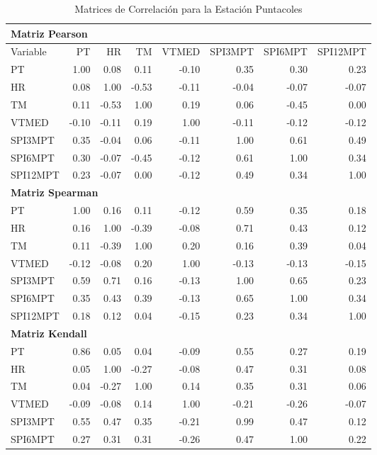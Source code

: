 \begin{table}[ht]
\centering
\caption{Matrices de Correlación para la Estación Puntacoles}
\begin{tabular}{lrrrrrrr}
\toprule
\multicolumn{8}{l}{\textbf{Matriz Pearson}} \\
\midrule
Variable & PT & HR & TM & VTMED & SPI3MPT & SPI6MPT & SPI12MPT \\
\midrule
PT       & 1.00 & 0.08 & 0.11 & -0.10 & 0.35 & 0.30 & 0.23 \\
HR       & 0.08 & 1.00 & -0.53 & -0.11 & -0.04 & -0.07 & -0.07 \\
TM       & 0.11 & -0.53 & 1.00 & 0.19 & 0.06 & -0.45 & 0.00 \\
VTMED    & -0.10 & -0.11 & 0.19 & 1.00 & -0.11 & -0.12 & -0.12 \\
SPI3MPT  & 0.35 & -0.04 & 0.06 & -0.11 & 1.00 & 0.61 & 0.49 \\
SPI6MPT  & 0.30 & -0.07 & -0.45 & -0.12 & 0.61 & 1.00 & 0.34 \\
SPI12MPT & 0.23 & -0.07 & 0.00 & -0.12 & 0.49 & 0.34 & 1.00 \\
\midrule
\multicolumn{8}{l}{\textbf{Matriz Spearman}} \\
\midrule
PT       & 1.00 & 0.16 & 0.11 & -0.12 & 0.59 & 0.35 & 0.18 \\
HR       & 0.16 & 1.00 & -0.39 & -0.08 & 0.71 & 0.43 & 0.12 \\
TM       & 0.11 & -0.39 & 1.00 & 0.20 & 0.16 & 0.39 & 0.04 \\
VTMED    & -0.12 & -0.08 & 0.20 & 1.00 & -0.13 & -0.13 & -0.15 \\
SPI3MPT  & 0.59 & 0.71 & 0.16 & -0.13 & 1.00 & 0.65 & 0.23 \\
SPI6MPT  & 0.35 & 0.43 & 0.39 & -0.13 & 0.65 & 1.00 & 0.34 \\
SPI12MPT & 0.18 & 0.12 & 0.04 & -0.15 & 0.23 & 0.34 & 1.00 \\
\midrule
\multicolumn{8}{l}{\textbf{Matriz Kendall}} \\
\midrule
PT       & 0.86 & 0.05 & 0.04 & -0.09 & 0.55 & 0.27 & 0.19 \\
HR       & 0.05 & 1.00 & -0.27 & -0.08 & 0.47 & 0.31 & 0.08 \\
TM       & 0.04 & -0.27 & 1.00 & 0.14 & 0.35 & 0.31 & 0.06 \\
VTMED    & -0.09 & -0.08 & 0.14 & 1.00 & -0.21 & -0.26 & -0.07 \\
SPI3MPT  & 0.55 & 0.47 & 0.35 & -0.21 & 0.99 & 0.47 & 0.12 \\
SPI6MPT  & 0.27 & 0.31 & 0.31 & -0.26 & 0.47 & 1.00 & 0.22 \\

\end{tabular}
\end{table}
